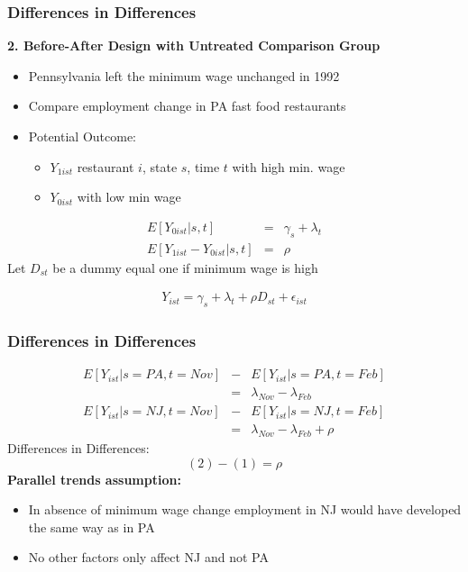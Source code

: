 \documentclass[notes=show,beamer,compress]{beamer}
\begin{document}







\begin{frame}
\frametitle{Differences in Differences}

\textbf{2. Before-After Design with Untreated Comparison Group}
\begin{itemize}
\item  Pennsylvania left the minimum wage unchanged in 1992
\item Compare employment change in PA fast food restaurants
\item Potential Outcome:
\begin {itemize}
\item $Y_{1ist}$ restaurant $i$, state $s$, time $t$  with high min. wage
\item  $Y_{0ist}$  with low min wage
\end {itemize}
\end {itemize}

 \begin{eqnarray*}
	          E[ Y_{0ist}| s,t] &=& \gamma_{s} + \lambda_{t} \\
	           E[ Y_{1ist}-Y_{0ist}| s,t] &=& \rho
  \end{eqnarray*}
Let $D_{st}$ be a dummy equal one if minimum wage is high

 \begin{eqnarray*}
  Y_{ist} =\gamma_{s} + \lambda_{t} + \rho D_{st}+ \epsilon_ {ist}
\end{eqnarray*}

\end{frame}





\begin{frame}
\frametitle{Differences in Differences }

 \begin{eqnarray}
 E[Y_{ist}| s=PA, t=Nov]&-& E[Y_{ist}| s=PA, t=Feb]  \nonumber\\
&=& \lambda_{Nov}-\lambda_{Feb} \\
E[Y_{ist}| s=NJ, t=Nov] &-&E[Y_{ist}| s=NJ, t=Feb] \nonumber\\
&=&\lambda_{Nov}-\lambda_{Feb}+ \rho
\end{eqnarray}
Differences in Differences:
\[ (2) - (1) = \rho  \]
\textbf{Parallel trends assumption:}
\begin {itemize}
\item In absence of minimum wage change employment in NJ would have developed the same way as in PA
\item No other factors only affect NJ and not PA
\end {itemize}

\end{frame}
\end{document}
